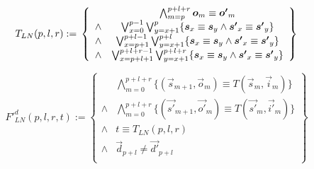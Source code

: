\documentclass[runningheads,a4paper,orivec]{llncs}
\begin{document}
\begin{equation}\label{tln}
T_{LN}(p,l,r):=\\
\left\{
\begin{array}{cc}
      &\bigwedge_{m=p}^{p+l+r}\vec{o}_m\equiv \vec{o'}_m \\
\wedge&\bigvee_{x=0}^{p-1}\bigvee_{y=x+1}^{p} \{\vec{s}_x\equiv \vec{s}_y\wedge \vec{s'}_x\equiv \vec{s'}_y\} \\
\wedge&\bigvee_{x=p+1}^{p+l-1}\bigvee_{y=x+1}^{p+l} \{\vec{s}_x\equiv \vec{s}_y\wedge \vec{s'}_x\equiv \vec{s'}_y\} \\
\wedge&\bigvee_{x=p+l+1}^{p+l+r-1}\bigvee_{y=x+1}^{p+l+r} \{\vec{s}_x\equiv \vec{s}_y\wedge \vec{s'}_x\equiv \vec{s'}_y\}
\end{array}
\right\}
\end{equation}


\begin{equation}\label{lndef1}
F'^d_{LN}(p,l,r,t):=
\left\{
\begin{array}{cc}
&\bigwedge_{m=0}^{p+l+r}
\{
(\vec{s}_{m+1},\vec{o}_m)\equiv T(\vec{s}_m,\vec{i}_m)
\}
\\
\wedge&\bigwedge_{m=0}^{p+l+r}
\{
(\vec{s'}_{m+1},\vec{o'}_m)\equiv T(\vec{s'}_m,\vec{i'}_m)
\}
\\
\wedge& t\equiv T_{LN}(p,l,r)\\
\wedge& \vec{d}_{p+l}\ne \vec{d'}_{p+l} \\
\end{array}
\right\}
\end{equation}

\end{document}
